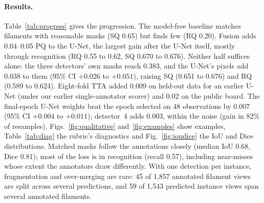 \documentclass[sigconf]{acmart}
\begin{document}
\paragraph{Results.} Table~\ref{tab:progress} gives the progression. The model-free baseline matches filaments with reasonable masks (SQ 0.65) but finds few (RQ 0.20). Fusion adds 0.04--0.05 PQ to the U-Net, the largest gain after the U-Net itself, mostly through recognition (RQ 0.55 to 0.62, SQ 0.670 to 0.676). Neither half suffices alone: the three detectors' own masks reach 0.383, and the U-Net's pixels add 0.038 to them (95\% CI $+0.026$ to $+0.051$), raising SQ (0.651 to 0.676) and RQ (0.589 to 0.624). Eight-fold TTA added 0.009 on held-out data for an earlier U-Net (under our earlier single-annotator scorer) and 0.02 on the public board. The final-epoch U-Net weights beat the epoch selected on 48 observations by 0.007 (95\% CI $+0.004$ to $+0.011$); detector~4 adds 0.003, within the noise (gain in 82\% of resamples). Figs.~\ref{fig:qualitative} and~\ref{fig:examples} show examples, Table~\ref{tab:diag} the rubric's diagnostics and Fig.~\ref{fig:ioudice} the IoU and Dice distributions. Matched masks follow the annotations closely (median IoU 0.68, Dice 0.81); most of the loss is in recognition (recall 0.57), including near-misses whose extent the annotators draw differently. With one detection per instance, fragmentation and over-merging are rare: 45 of 1{,}857 annotated filament views are split across several predictions, and 59 of 1{,}543 predicted instance views span several annotated filaments.
\end{document}

